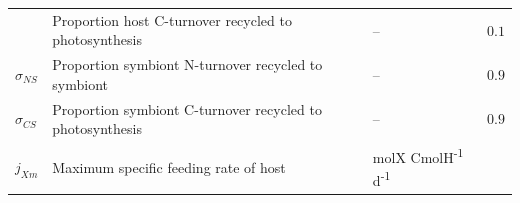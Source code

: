 \documentclass[]{elsarticle} %
\begin{document}
\begin{longtable}[c]{@{}llll@{}}
\begin{minipage}[t]{0.10\columnwidth}
\strut\end{minipage} &
\begin{minipage}[t]{0.48\columnwidth}\raggedright\strut
Proportion host C-turnover recycled to photosynthesis
\strut\end{minipage} &
\begin{minipage}[t]{0.25\columnwidth}\raggedright\strut
--
\strut\end{minipage} &
\begin{minipage}[t]{0.10\columnwidth}\raggedright\strut
\(0.1\)
\strut\end{minipage}\tabularnewline
\begin{minipage}[t]{0.10\columnwidth}\raggedright\strut
\(\sigma_{NS}\)
\strut\end{minipage} &
\begin{minipage}[t]{0.48\columnwidth}\raggedright\strut
Proportion symbiont N-turnover recycled to symbiont
\strut\end{minipage} &
\begin{minipage}[t]{0.25\columnwidth}\raggedright\strut
--
\strut\end{minipage} &
\begin{minipage}[t]{0.10\columnwidth}\raggedright\strut
\(0.9\)
\strut\end{minipage}\tabularnewline
\begin{minipage}[t]{0.10\columnwidth}\raggedright\strut
\(\sigma_{CS}\)
\strut\end{minipage} &
\begin{minipage}[t]{0.48\columnwidth}\raggedright\strut
Proportion symbiont C-turnover recycled to photosynthesis
\strut\end{minipage} &
\begin{minipage}[t]{0.25\columnwidth}\raggedright\strut
--
\strut\end{minipage} &
\begin{minipage}[t]{0.10\columnwidth}\raggedright\strut
\(0.9\)
\strut\end{minipage}\tabularnewline
\begin{minipage}[t]{0.10\columnwidth}\raggedright\strut
\(j_{Xm}\)
\strut\end{minipage} &
\begin{minipage}[t]{0.48\columnwidth}\raggedright\strut
Maximum specific feeding rate of host
\strut\end{minipage} &
\begin{minipage}[t]{0.25\columnwidth}\raggedright\strut
molX CmolH\textsuperscript{-1} d\textsuperscript{-1}
\strut\end{minipage} &

\end{longtable}
\end{document}
